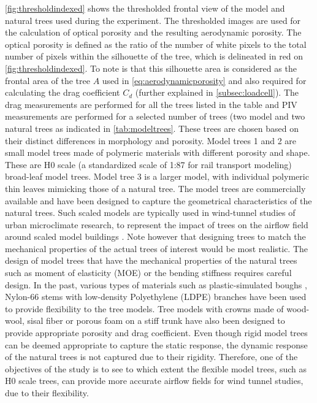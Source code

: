\cref{fig:thresholdindexed} shows the thresholded frontal view of the model and natural trees used during the experiment. The thresholded images are used for the calculation of optical porosity and the resulting aerodynamic porosity. The optical porosity is defined as the ratio of the number of white pixels to the total number of pixels within the silhouette of the tree, which is delineated in red on \cref{fig:thresholdindexed}. To note is that this silhouette area is considered as the frontal area of the tree $A$ used in \cref{eq:aerodynamicporosity} and also required for calculating the drag coefficient $C_d$ (further explained in \cref{subsec:loadcell}). The drag measurements are performed for all the trees listed in the table and PIV measurements are performed for a selected number of trees (two model and two natural trees as indicated in \cref{tab:modeltrees}. These trees are chosen based on their distinct differences in morphology and porosity. Model trees 1 and 2 are small model trees made of polymeric materials with different porosity and shape. These are H$0$ scale (a standardized scale of 1:87 for rail transport modeling) broad-leaf model trees. Model tree 3 is a larger model, with individual polymeric thin leaves mimicking those of a natural tree. The model trees are commercially available and have been designed to capture the geometrical characteristics of the natural trees. Such scaled models are typically used in wind-tunnel studies of urban microclimate research, to represent the impact of trees on the airflow field around scaled model buildings \citep{Gromke2018a,Gromke2008,Gromke2007,Guan2003,R.N.Meroney1968}. Note however that designing trees to match the mechanical properties of the actual trees of interest would be most realistic. The design of model trees that have the mechanical properties of the natural trees such as moment of elasticity (MOE) or the bending stiffness requires careful design. In the past, various types of materials such as plastic-simulated boughs \citep{R.N.Meroney1968}, Nylon-66 stems with low-density Polyethylene (LDPE) branches \citep{Stacey1994} have been used to provide flexibility to the tree models. Tree models with crowns made of wood-wool, sisal fiber or porous foam on a stiff trunk \citep{Gromke2008a} have also been designed to provide appropriate porosity and drag coefficient. Even though rigid model trees can be deemed appropriate to capture the static response, the dynamic response of the natural trees is not captured due to their rigidity. Therefore, one of the objectives of the study is to see to which extent the flexible model trees, such as H$0$ scale trees, can provide more accurate airflow fields for wind tunnel studies, due to their flexibility. 

